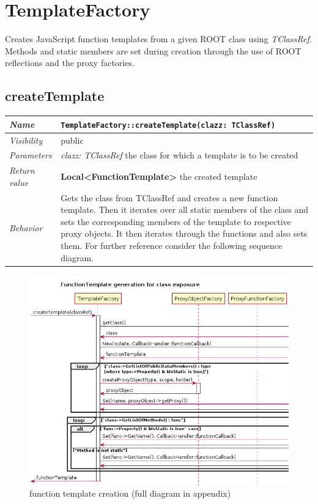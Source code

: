 \chapter{TemplateFactory}
Creates JavaScript function templates from a given ROOT class using \textit{TClassRef}. Methods and static members are set during creation through the use of ROOT reflections and the proxy factories.

\section{createTemplate}
\begin{longtable}{p{3cm} @{\hskip 1cm} p{12cm}}
 \hline
\textit{Name} & \texttt{TemplateFactory::createTemplate(clazz: TClassRef)}\\
\hline
 \textit{Visibility} & public\\
\hline
\textit{Parameters} & \textit{clazz: TClassRef} the class for which a template is to be created \\
\hline
\textit{Return value} & \textbf{Local<FunctionTemplate>} the created template\\
  \hline
 \textit{Behavior} & Gets the class from TClassRef and creates a new function template.
			Then it iterates over all static members of the class and sets the
			corresponding members of the template to respective proxy objects.
			It then iterates through the functions and also sets them.
			For further reference consider the following sequence diagram.\\
\hline
\end{longtable} \pagebreak

\begin{figure}[htb]
\includegraphics[width=16cm]{./latex/resources/functionTemplateGenerateCrop.png}
	\caption{function template creation (full diagram in appendix)}
\end{figure}
